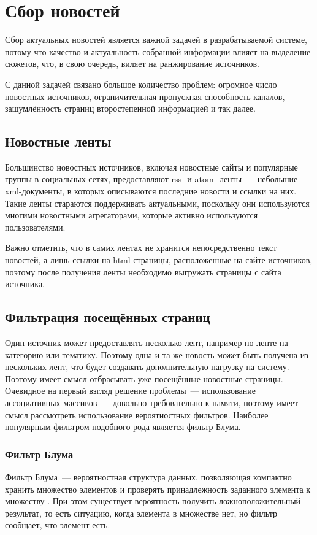 \section{Сбор новостей} \label{sec:collecting}
Сбор актуальных новостей является важной задачей в разрабатываемой системе, потому что качество и актуальность собранной информации влияет на выделение сюжетов, что, в свою очередь, виляет на ранжирование источников.

С данной задачей связано большое количество проблем: огромное число новостных источников, ограничительная пропускная способность каналов, зашумлённость страниц второстепенной информацией и так далее.

\subsection{Новостные ленты}
Большинство новостных источников, включая новостные сайты и популярные группы в социальных сетях, предоставляют rss- и atom- ленты~--- небольшие xml-документы, в которых описываются последние новости и ссылки на них. Такие ленты стараются поддерживать актуальными, поскольку они используются многими новостными агрегаторами, которые активно используются пользователями.

Важно отметить, что в самих лентах не хранится непосредственно текст новостей, а лишь ссылки на html-страницы, расположенные на сайте источников, поэтому после получения ленты необходимо выгружать страницы с сайта источника.

\subsection{Фильтрация посещённых страниц}
Один источник может предоставлять несколько лент, например по ленте на категорию или тематику. Поэтому одна и та же новость может быть получена из нескольких лент, что будет создавать дополнительную нагрузку на систему. Поэтому имеет смысл отбрасывать уже посещённые новостные страницы. Очевидное на первый взгляд решение проблемы~--- использование ассоциативных массивов~--- довольно требовательно к памяти, поэтому имеет смысл рассмотреть использование вероятностных фильтров. Наиболее популярным фильтром подобного рода является фильтр Блума.

\subsubsection{Фильтр Блума} \label{sssec:bloom-filter}
Фильтр Блума~--- вероятностная структура данных, позволяющая компактно хранить множество элементов и проверять принадлежность заданного элемента к множеству \cite{bloom70}. При этом существует вероятность получить ложноположительный результат, то есть ситуацию, когда элемента в множестве нет, но фильтр сообщает, что элемент есть.

